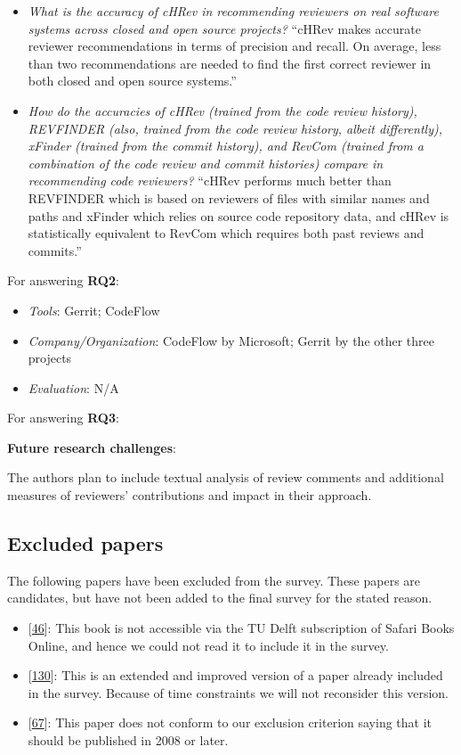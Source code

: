 \documentclass[]{book}
\providecommand{\tightlist}{%
  \setlength{\itemsep}{0pt}\setlength{\parskip}{0pt}}
\begin{document}
\begin{itemize}
\item
  \emph{What is the accuracy of cHRev in recommending reviewers on real
  software systems across closed and open source projects?} ``cHRev
  makes accurate reviewer recommendations in terms of precision and
  recall. On average, less than two recommendations are needed to find
  the first correct reviewer in both closed and open source systems.''
\item
  \emph{How do the accuracies of cHRev (trained from the code review
  history), REVFINDER (also, trained from the code review history,
  albeit differently), xFinder (trained from the commit history), and
  RevCom (trained from a combination of the code review and commit
  histories) compare in recommending code reviewers?} ``cHRev performs
  much better than REVFINDER which is based on reviewers of files with
  similar names and paths and xFinder which relies on source code
  repository data, and cHRev is statistically equivalent to RevCom which
  requires both past reviews and commits.''
\end{itemize}

For answering \textbf{RQ2}:

\begin{itemize}
\tightlist
\item
  \emph{Tools}: Gerrit; CodeFlow
\item
  \emph{Company/Organization}: CodeFlow by Microsoft; Gerrit by the
  other three projects
\item
  \emph{Evaluation}: N/A
\end{itemize}

For answering \textbf{RQ3}:

\textbf{Future research challenges}:

The authors plan to include textual analysis of review comments and
additional measures of reviewers' contributions and impact in their
approach.

\subsection{Excluded papers}\label{excluded-papers}

The following papers have been excluded from the survey. These papers
are candidates, but have not been added to the final survey for the
stated reason.

\begin{itemize}
\tightlist
\item
  {[}\protect\hyperlink{ref-cohen2010modern}{46}{]}: This book is not
  accessible via the TU Delft subscription of Safari Books Online, and
  hence we could not read it to include it in the survey.
\item
  {[}\protect\hyperlink{ref-mcintosh2016empirical}{130}{]}: This is an
  extended and improved version of a paper already included in the
  survey. Because of time constraints we will not reconsider this
  version.
\item
  {[}\protect\hyperlink{ref-fagan2002design}{67}{]}: This paper does not
  conform to our exclusion criterion saying that it should be published
  in 2008 or later.
\end{itemize}
\end{document}
